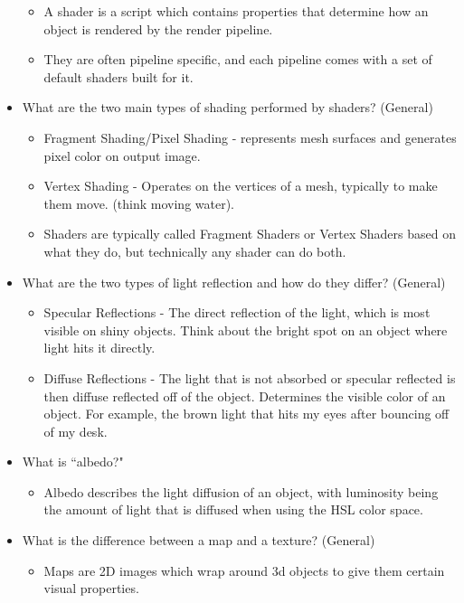 \documentclass{article}
\begin{document}
\begin{itemize}
    \begin{itemize}
        \item A shader is a script which contains properties that determine how an object is rendered by the render pipeline.
        \item They are often pipeline specific, and each pipeline comes with a set of default shaders built for it.
    \end{itemize}
    \item What are the two main types of shading performed by shaders? (General)
    \begin{itemize}
        \item Fragment Shading/Pixel Shading - represents mesh surfaces and generates pixel color on output image.
        \item Vertex Shading - Operates on the vertices of a mesh, typically to make them move. (think moving water).
        \item Shaders are typically called Fragment Shaders or Vertex Shaders based on what they do, but technically any shader can do both.
    \end{itemize}
    \item What are the two types of light reflection and how do they differ? (General)
    \begin{itemize}
        \item Specular Reflections - The direct reflection of the light, which is most visible on shiny objects. Think about the bright spot on an object where light hits it directly.
        \item Diffuse Reflections - The light that is not absorbed or specular reflected is then diffuse reflected off of the object. Determines the visible color of an object. For example, the brown light that hits my eyes after bouncing off of my desk.
    \end{itemize}
    \item What is ``albedo?"
    \begin{itemize}
        \item Albedo describes the light diffusion of an object, with luminosity being the amount of light that is diffused when using the HSL color space.
    \end{itemize}
    \item What is the difference between a map and a texture? (General)
    \begin{itemize}
        \item Maps are 2D images which wrap around 3d objects to give them certain visual properties.

\end{itemize}
\end{itemize}
\end{document}
